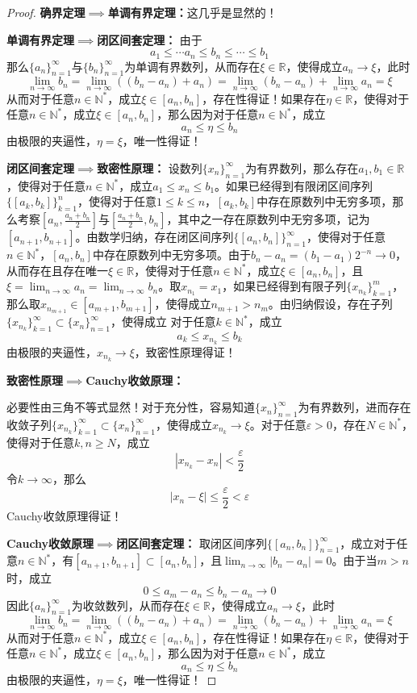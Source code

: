 \documentclass[lang = cn, scheme = chinese, thmcnt = section]{elegantbook}
\newcommand{\N}{\mathbb{N}}            %
\newcommand{\R}{\mathbb{R}}            %
\newcommand{\sub}{\subset}             %
\begin{document}
\begin{proof}
	{\bf 确界定理$\implies$单调有界定理：}这几乎是显然的！
	
	{\bf 单调有界定理$\implies$闭区间套定理：}
	由于
	$$
	a_1\le\cdots a_n\le b_n\le \cdots \le b_1
	$$
	那么$\{a_n\}_{n=1}^{\infty}$与$\{b_n\}_{n=1}^{\infty}$为单调有界数列，从而存在$\xi\in\R$，使得成立$a_n\to\xi$，此时
	$$
	\lim_{n\to\infty}b_n
	=\lim_{n\to\infty}((b_n-a_n)+a_n)
	=\lim_{n\to\infty}(b_n-a_n)+\lim_{n\to\infty}a_n
	=\xi
	$$
	从而对于任意$n\in\N^*$，成立$\xi\in [a_n,b_n]$，存在性得证！如果存在$\eta\in\R$，使得对于任意$n\in\N^*$，成立$\xi\in [a_n,b_n]$，那么因为对于任意$n\in\N^*$，成立
	$$
	a_n\le \eta \le b_n
	$$
	由极限的夹逼性，$\eta=\xi$，唯一性得证！
	
	{\bf 闭区间套定理$\implies$致密性原理：}
	设数列$\{x_n\}_{n=1}^{\infty}$为有界数列，那么存在$a_1,b_1\in\R$，使得对于任意$n\in\N^*$，成立$a_1\le x_n\le b_1$。如果已经得到有限闭区间序列$\{ [a_k,b_k] \}_{k=1}^{n}$，使得对于任意$1\le k\le n$，$[a_k,b_k]$中存在原数列中无穷多项，那么考察$\left[a_n,\frac{a_n+b_n}{2}\right]$与$\left[\frac{a_n+b_n}{2},b_n\right]$，其中之一存在原数列中无穷多项，记为$[a_{n+1},b_{n+1}]$。由数学归纳，存在闭区间序列$\{ [a_n,b_n] \}_{n=1}^{\infty}$，使得对于任意$n\in\N^*$，$[a_n,b_n]$中存在原数列中无穷多项。由于$b_n-a_n=(b_1-a_1)2^{-n}\to 0$，从而存在且存在唯一$\xi\in\R$，使得对于任意$n\in\N^*$，成立$\xi\in [a_n,b_n]$，且$\displaystyle \xi=\lim_{n\to\infty}a_n=\lim_{n\to\infty}b_n$。取$x_{n_1}=x_1$，如果已经得到有限子列$\{x_{n_k}\}_{k=1}^{m}$，那么取$x_{n_{m+1}}\in [a_{m+1},b_{m+1}]$，使得成立$n_{m+1}>n_m$。由归纳假设，存在子列$\{x_{n_k}\}_{k=1}^{\infty}\sub \{x_n\}_{n=1}^{\infty}$，使得成立
	对于任意$k\in\N^*$，成立
	$$
	a_k\le x_{n_k} \le b_k
	$$
	由极限的夹逼性，$x_{n_k}\to \xi$，致密性原理得证！
	
	{\bf 致密性原理$\implies$Cauchy收敛原理：}
	
	必要性由三角不等式显然！对于充分性，容易知道$\{x_n\}_{n=1}^{\infty}$为有界数列，进而存在收敛子列$\{x_{n_k}\}_{k=1}^{\infty}\sub \{x_n\}_{n=1}^{\infty}$，使得成立$x_{n_k}\to \xi$。对于任意$\varepsilon>0$，存在$N\in\N^*$，使得对于任意$k,n\ge N$，成立
	$$
	|x_{n_k}-x_n|<\frac{\varepsilon}{2}
	$$
	令$k\to\infty$，那么
	$$
	|x_n-\xi|\le\frac{\varepsilon}{2}<\varepsilon
	$$
	Cauchy收敛原理得证！
	
	{\bf Cauchy收敛原理$\implies$闭区间套定理：}
	取闭区间序列$\{ [a_n,b_n] \}_{n=1}^{\infty}$，成立对于任意$n\in\N^*$，有$[a_{n+1},b_{n+1}]\sub [a_n,b_n]$，且$\displaystyle \lim_{n\to\infty}|b_n-a_n|=0$。由于当$m>n$时，成立
	$$
	0\le a_m-a_n\le b_n-a_n\to 0
	$$
	因此$\{ a_n \}_{n=1}^{\infty}$为收敛数列，从而存在$\xi\in\R$，使得成立$a_n\to\xi$，此时
	$$
	\lim_{n\to\infty}b_n
	=\lim_{n\to\infty}((b_n-a_n)+a_n)
	=\lim_{n\to\infty}(b_n-a_n)+\lim_{n\to\infty}a_n
	=\xi
	$$
	从而对于任意$n\in\N^*$，成立$\xi\in [a_n,b_n]$，存在性得证！如果存在$\eta\in\R$，使得对于任意$n\in\N^*$，成立$\xi\in [a_n,b_n]$，那么因为对于任意$n\in\N^*$，成立
	$$
	a_n\le \eta \le b_n
	$$
	由极限的夹逼性，$\eta=\xi$，唯一性得证！
	

\end{proof}
\end{document}
